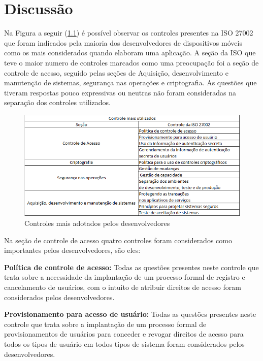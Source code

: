  \chapter{\label{chap:intro}Discussão}
 
Na Figura a seguir (\ref{fig:cont1}) é possível observar os controles presentes na ISO 27002 que foram indicados pela maioria dos desenvolvedores de dispositivos móveis como os mais considerados quando elaboram uma aplicação. A seção da ISO que teve o maior numero de controles marcados como uma preocupação foi a seção de controle de acesso, seguido pelas seções de Aquisição, desenvolvimento e manutenção de sistemas, segurança nas operações e criptografia. As questões que tiveram respostas pouco expressivas ou neutras não foram consideradas na separação dos controles utilizados.

\begin{figure}[H]
\centering
\includegraphics[scale=0.7]{fig2/maisusados.png}
\caption{Controles mais adotados pelos desenvolvedores}
\label{fig:cont1}
\end{figure}

Na seção de controle de acesso quatro controles foram considerados como importantes pelos desenvolvedores, são eles:

\vspace{0.5cm}
\noindent\textbf{Política de controle de acesso:}
Todas as questões presentes neste controle que trata sobre a necessidade da implantação de um processo formal de registro e cancelamento de usuários, com o intuito de atribuir direitos de acesso foram considerados pelos desenvolvedores. 

\vspace{0.5cm}
\noindent\textbf{Provisionamento para acesso de usuário:}
Todas as questões presentes neste controle que trata sobre a implantação de um processo formal de provisionamentos de usuários para conceder e revogar direitos de acesso para todos os tipos de usuário em todos tipos de sistema foram considerados pelos desenvolvedores.

